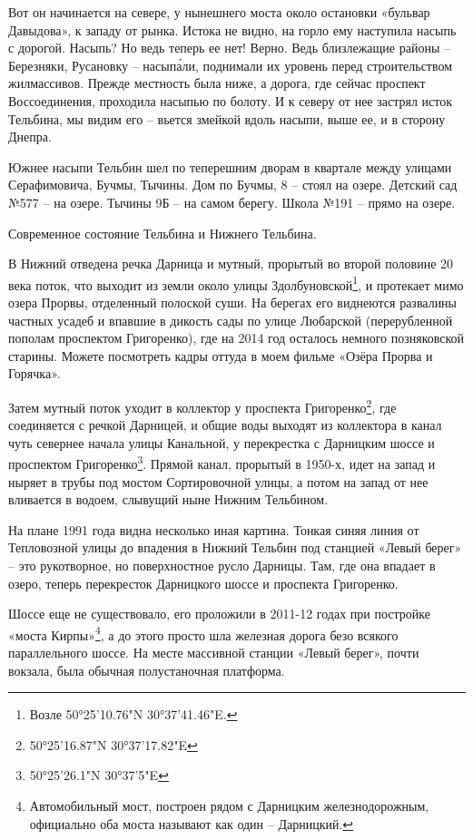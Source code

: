 Вот он начинается на севере, у нынешнего моста около остановки «бульвар Давыдова», к западу от рынка. Истока не видно, на горло ему наступила насыпь с дорогой. Насыпь? Но ведь теперь ее нет! Верно. Ведь близлежащие районы – Березняки, Русановку – насып\'али, поднимали их уровень перед строительством жилмассивов. Прежде местность была ниже, а дорога, где сейчас проспект Воссоединения, проходила насыпью по болоту. И к северу от нее застрял исток Тельбина, мы видим его – вьется змейкой вдоль насыпи, выше ее, и в сторону Днепра.

Южнее насыпи Тельбин шел по теперешним дворам в квартале между улицами Серафимовича, Бучмы, Тычины. Дом по Бучмы, 8 – стоял на озере. Детский сад №577 – на озере. Тычины 9Б – на самом берегу. Школа №191 – прямо на озере.

Современное состояние Тельбина и Нижнего Тельбина.

В Нижний отведена речка Дарница и мутный, прорытый во второй половине 20 века поток, что выходит из земли около улицы Здолбуновской\footnote{Возле 50°25'10.76"N 30°37'41.46"E.}, и протекает мимо озера Прорвы, отделенный полоской суши. На берегах его виднеются развалины частных усадеб и впавшие в дикость сады по улице Любарской (перерубленной пополам проспектом Григоренко), где на 2014 год осталось немного позняковской старины. Можете посмотреть кадры оттуда в моем фильме «Озёра Прорва и Горячка».

Затем мутный поток уходит в коллектор у проспекта Григоренко\footnote{50°25'16.87"N 30°37'17.82"E}, где соединяется с речкой Дарницей, и общие воды выходят из коллектора в канал чуть севернее начала улицы Канальной, у перекрестка с Дарницким шоссе и проспектом Григоренко\footnote{50°25'26.1"N 30°37'5"E}. Прямой канал, прорытый в 1950-х, идет на запад и ныряет в трубы под мостом Сортировочной улицы, а потом на запад от нее вливается в водоем, слывущий ныне Нижним Тельбином.

На плане 1991 года видна несколько иная картина. Тонкая синяя линия от Тепловозной улицы до впадения в Нижний Тельбин под станцией «Левый берег» – это рукотворное, но поверхностное русло Дарницы. Там, где она впадает в озеро, теперь перекресток Дарницкого шоссе и проспекта Григоренко.

Шоссе еще не существовало, его проложили в 2011-12 годах при постройке «моста Кирпы»\footnote{Автомобильный мост, построен рядом с Дарницким железнодорожным, официально оба моста называют как один – Дарницкий.}, а до этого просто шла железная дорога безо всякого параллельного шоссе. На месте массивной станции «Левый берег», почти вокзала, была обычная полустаночная платформа. %

